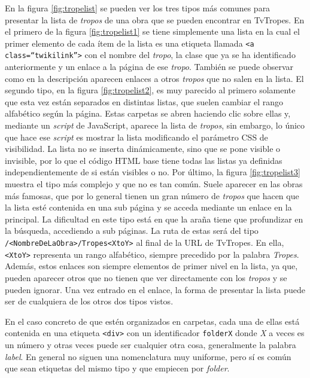 En la figura \ref{fig:tropelist} se pueden ver los tres tipos más comunes para
presentar la lista de \textit{tropos} de una obra que se pueden encontrar en
TvTropes. En el primero de la figura \ref{fig:tropelist1} se tiene simplemente
una lista en la cual el primer elemento de cada ítem de la lista es una etiqueta
llamada \texttt{<a class=``twikilink''>} con el nombre del \textit{tropo}, la
clase que ya se ha identificado anteriormente y un enlace a la página de ese
\textit{tropo}. También se puede observar como en la descripción aparecen
enlaces a otros \textit{tropos} que no salen en la lista. El segundo tipo, en la
figura \ref{fig:tropelist2}, es muy parecido al primero solamente que esta vez
están separados en distintas listas, que suelen cambiar el rango alfabético
según la página. Estas carpetas se abren haciendo clic sobre ellas y, mediante
un \textit{script} de JavaScript, aparece la lista de \textit{tropos}, sin
embargo, lo único que hace ese \textit{script} es mostrar la lista modificando
el parámetro CSS de visibilidad. La lista no se inserta dinámicamente, sino que
se pone visible o invisible, por lo que el código HTML base tiene todas las
listas ya definidas independientemente de si están visibles o no. Por último, la
figura \ref{fig:tropelist3} muestra el tipo más complejo y que no es tan común.
Suele aparecer en las obras más famosas, que por lo general tienen un gran
número de \textit{tropos} que hacen que la lista esté contenida en una sub
página y se acceda mediante un enlace en la principal. La dificultad en este
tipo está en que la araña tiene que profundizar en la búsqueda, accediendo a sub
páginas. La ruta de estas será del tipo \texttt{/<NombreDeLaObra>/Tropes<XtoY>}
al final de la URL de TvTropes. En ella, \texttt{<XtoY>} representa un rango
alfabético, siempre precedido por la palabra \textit{Tropes}. Además, estos
enlaces son siempre elementos de primer nivel en la lista, ya que, pueden
aparecer otros que no tienen que ver directamente con los \textit{tropos} y se
pueden ignorar. Una vez entrado en el enlace, la forma de presentar la lista
puede ser de cualquiera de los otros dos tipos vistos.

En el caso concreto de que estén organizados en carpetas, cada una de ellas está
contenida en una etiqueta \texttt{<div>} con un identificador \texttt{folderX}
donde \textit{X} a veces es un número y otras veces puede ser cualquier otra
cosa, generalmente la palabra \textit{label}. En general no siguen una
nomenclatura muy uniforme, pero sí es común que sean etiquetas del mismo tipo y
que empiecen por \textit{folder}. 

